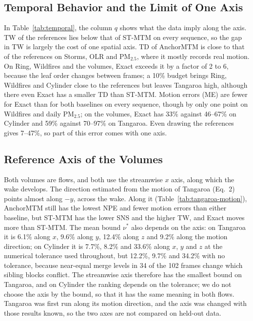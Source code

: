 \documentclass[preprint]{vgtc}
\begin{document}
\subsection{Temporal Behavior and the Limit of One Axis}

In Table~\ref{tab:temporal}, the column $q$ shows what the data imply along the axis. TW of the references lies below that of ST-MTM on every sequence, so the gap in TW is largely the cost of one spatial axis. TD of AnchorMTM is close to that of the references on Storms, OLR and PM$_{2.5}$, where it mostly records real motion. On Ring, Wildfires and the volumes, Exact exceeds it by a factor of 2 to 6, because the leaf order changes between frames; a 10\% budget brings Ring, Wildfires and Cylinder close to the references but leaves Tangaroa high, although there even Exact has a smaller TD than ST-MTM. Motion errors (ME) are fewer for Exact than for both baselines on every sequence, though by only one point on Wildfires and daily PM$_{2.5}$; on the volumes, Exact has 33\% against 46--67\% on Cylinder and 59\% against 70--97\% on Tangaroa. Even drawing the references gives 7--47\%, so part of this error comes with one axis.

\subsection{Reference Axis of the Volumes}\label{sec:volume-axis}

Both volumes are flows, and both use the streamwise $x$ axis, along which the wake develops. The direction estimated from the motion of Tangaroa (Eq.~2) points almost along $-y$, across the wake. Along it (Table~\ref{tab:tangaroa-motion}), AnchorMTM still has the lowest NPE and fewer motion errors than either baseline, but ST-MTM has the lower SNS and the higher TW, and Exact moves more than ST-MTM. The mean bound $\nu^*$ also depends on the axis: on Tangaroa it is 6.1\% along $x$, 9.6\% along $y$, 12.4\% along $z$ and 9.2\% along the motion direction; on Cylinder it is 7.7\%, 8.2\% and 33.6\% along $x$, $y$ and $z$ at the numerical tolerance used throughout, but 12.2\%, 9.7\% and 34.2\% with no tolerance, because near-equal merge levels in 34 of the 102 frames change which sibling blocks conflict. The streamwise axis therefore has the smallest bound on Tangaroa, and on Cylinder the ranking depends on the tolerance; we do not choose the axis by the bound, so that it has the same meaning in both flows. Tangaroa was first run along its motion direction, and the axis was changed with those results known, so the two axes are not compared on held-out data.
\end{document}
